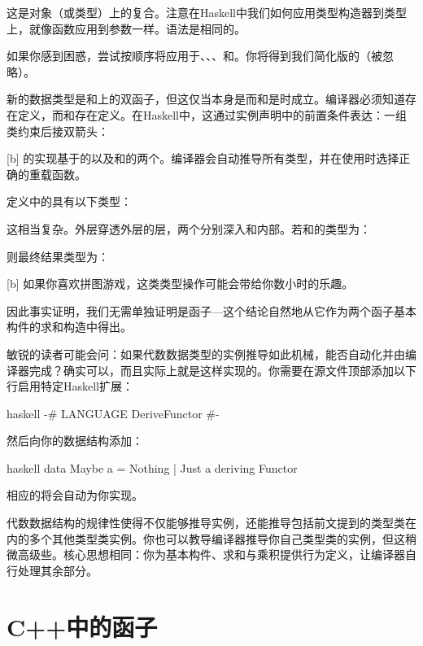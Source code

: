 这是对象（或类型）上的复合。注意在Haskell中我们如何应用类型构造器到类型上，就像函数应用到参数一样。语法是相同的。

如果你感到困惑，尝试按顺序将应用于、、、和。你将得到我们简化版的（被忽略）。

新的数据类型是和上的双函子，但这仅当本身是而和是时成立。编译器必须知道存在定义，而和存在定义。在Haskell中，这通过实例声明中的前置条件表达：一组类约束后接双箭头：

[b]
的实现基于的以及和的两个。编译器会自动推导所有类型，并在使用时选择正确的重载函数。

定义中的具有以下类型：

这相当复杂。外层穿透外层的层，两个分别深入和内部。若和的类型为：

则最终结果类型为：

[b]
如果你喜欢拼图游戏，这类类型操作可能会带给你数小时的乐趣。

因此事实证明，我们无需单独证明是函子---这个结论自然地从它作为两个函子基本构件的求和构造中得出。

敏锐的读者可能会问：如果代数数据类型的实例推导如此机械，能否自动化并由编译器完成？确实可以，而且实际上就是这样实现的。你需要在源文件顶部添加以下行启用特定Haskell扩展：

\begin{snip}{haskell}
{-# LANGUAGE DeriveFunctor #-}
\end{snip}
然后向你的数据结构添加：

\begin{snip}{haskell}
data Maybe a = Nothing | Just a deriving Functor
\end{snip}
相应的将会自动为你实现。

代数数据结构的规律性使得不仅能够推导实例，还能推导包括前文提到的类型类在内的多个其他类型类实例。你也可以教导编译器推导你自己类型类的实例，但这稍微高级些。核心思想相同：你为基本构件、求和与乘积提供行为定义，让编译器自行处理其余部分。

\section{C++中的函子}

